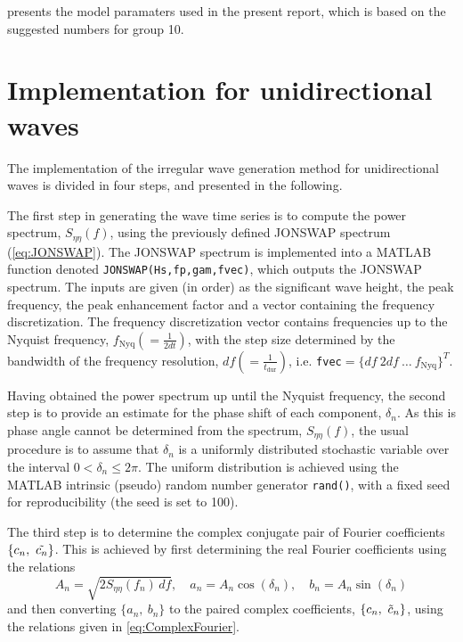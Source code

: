  presents the model paramaters used in the present report, which is based on the suggested numbers for group 10.

\section{Implementation for unidirectional waves}
The implementation of the irregular wave generation method for unidirectional waves is divided in four steps, and presented in the following.

The first step in generating the wave time series is to compute the power spectrum, $S_{\eta \eta}(f)$, using the previously defined JONSWAP spectrum (\cref{eq:JONSWAP}). The JONSWAP spectrum is implemented into a MATLAB function denoted \verb+JONSWAP(Hs,fp,gam,fvec)+, which outputs the JONSWAP spectrum. The inputs are given (in order) as the significant wave height, the peak frequency, the peak enhancement factor and a vector containing the frequency discretization. The frequency discretization vector contains frequencies up to the Nyquist frequency, $f_{\text{Nyq}}(=\frac{1}{2dt})$, with the step size determined by the bandwidth of the frequency resolution, $df(=\frac{1}{t_{\text{dur}}})$, i.e. \verb+fvec+$=\{df\ 2df \ \dots \ f_{\text{Nyq}}\}^T$.

Having obtained the power spectrum up until the Nyquist frequency, the second step is to provide an estimate for the phase shift of each component, $\delta_n$. As this is phase angle cannot be determined from the spectrum, $S_{\eta \eta}(f)$, the usual procedure is to assume that $\delta_n$ is a uniformly distributed stochastic variable over the interval $0<\delta_n\leq 2\pi$. The uniform distribution is achieved using the MATLAB intrinsic (pseudo) random number generator \verb+rand()+, with a fixed seed for reproducibility (the seed is set to 100).

The third step is to determine the complex conjugate pair of Fourier coefficients $\{c_n,\ \Tilde{c_n}\}$. This is achieved by first determining the real Fourier coefficients using the relations
\begin{equation}
    A_n = \sqrt{2 S_{\eta \eta}(f_n)\,df}, \quad a_n=A_n\cos{(\delta_n)}, \quad b_n=A_n\sin{(\delta_n)}
\end{equation}
and then converting $\{a_n,\ b_n \}$ to the paired complex coefficients, $\{c_n,\ \Tilde{c}_n\}$, using the relations given in \cref{eq:ComplexFourier}.

